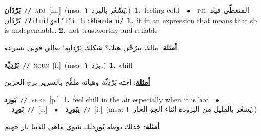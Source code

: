 \documentclass[10pt,a4paper,twoside]{article} %
\begin{document}
\begin{multicols}{2}
{\setlength\topsep{0pt}\textbf{\foreignlanguage{arabic}{بَرْدَان}}\ {\color{gray}\texttt{//}\color{black}}\ \textsc{adj}\ [m.]\ \color{gray}(msa. \foreignlanguage{arabic}{يَشْعُر بالبرد}~\foreignlanguage{arabic}{\textbf{١.}})\color{black}\ \textbf{1.}~feeling cold\ \ $\bullet$\ \ \textsc{ph.} \color{gray} \foreignlanguage{arabic}{المتغطِّي فيك بَرْدَان}\color{black}\ {\color{gray}\texttt{/{\sffamily ʔilmitɣatˤtˤi fiːkbardaːn}/}\color{black}}\ \textbf{1.}~it in an expression that means that sb is undependable.  \textbf{2.}~not trustworthy and reliable\  \begin{flushright}\color{gray}\foreignlanguage{arabic}{\textbf{\underline{\foreignlanguage{arabic}{أمثلة}}}: مالك بترُجِّي هيك؟ شكلك بَرْدانِة! تعالي فوتي بسرعة.}\end{flushright}\color{black}} \vspace{2mm}

{\setlength\topsep{0pt}\textbf{\foreignlanguage{arabic}{بَرْدِيِّة}}\ {\color{gray}\texttt{//}\color{black}}\ \textsc{noun}\ [f.]\ \color{gray}(msa. \foreignlanguage{arabic}{برَد}~\foreignlanguage{arabic}{\textbf{١.}})\color{black}\ \textbf{1.}~chill\  \begin{flushright}\color{gray}\foreignlanguage{arabic}{\textbf{\underline{\foreignlanguage{arabic}{أمثلة}}}: اجته بَرْدِيِّة وهياته ملقَّح بالسرير برج الحزين}\end{flushright}\color{black}} \vspace{2mm}

{\setlength\topsep{0pt}\textbf{\foreignlanguage{arabic}{بَورَد}}\ {\color{gray}\texttt{//}\color{black}}\ \textsc{verb}\ [p.]\ \textbf{1.}~feel chill in the air especially when it is hot\ \ $\bullet$\ \ \setlength\topsep{0pt}\textbf{\foreignlanguage{arabic}{بَورِد}}\ {\color{gray}\texttt{//}\color{black}}\ [c.]\ \ $\bullet$\ \ \setlength\topsep{0pt}\textbf{\foreignlanguage{arabic}{يبَورِد}}\ {\color{gray}\texttt{//}\color{black}}\ [i.]\ \color{gray}(msa. \foreignlanguage{arabic}{يَشعُر بالقليل من البرودة أثناء الجو الحار}~\foreignlanguage{arabic}{\textbf{١.}})\color{black}\  \begin{flushright}\color{gray}\foreignlanguage{arabic}{\textbf{\underline{\foreignlanguage{arabic}{أمثلة}}}: خذلك بوظة بُورِدلك شوي ماهي الدنيا نار جهنم}\end{flushright}\color{black}} \vspace{2mm}


\end{multicols}
\end{document}
